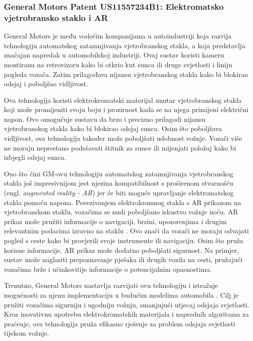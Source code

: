 \documentclass{foi}
\begin{document}
\subsubsection{General Motors Patent US11557234B1: Elektromatsko vjetrobransko staklo i AR}

General Motors je među vodećim kompanijama u autoindustriji \cite{GeneralMotors} koja razvija tehnologiju automatskog zatamnjivanja vjetrobranskog stakla, a koja predstavlja značajan napredak u automobilskoj industriji. Ovaj sustav koristi kameru montiranu na retrovizoru kako bi otkrio kut sunca ili druge svjetlosti i liniju pogleda vozača. Zatim prilagođava nijansu vjetrobranskog stakla kako bi blokirao odsjaj i poboljšao vidljivost. \cite{GeneralMotors2022}

Ova tehnologija koristi elektrokromatski materijal unutar vjetrobranskog stakla koji može promijeniti svoju boju i prozirnost kada se na njega primijeni električni napon. Ovo omogućuje sustavu da brzo i precizno prilagodi nijansu vjetrobranskog stakla kako bi blokirao odsjaj sunca. Osim što poboljšava vidljivost, ova tehnologija također može poboljšati udobnost vožnje. Vozači više ne moraju neprestano podešavati štitnik za sunce ili mijenjati položaj kako bi izbjegli odsjaj sunca. \cite{Bogdan2023}

Ono što čini GM-ovu tehnologiju automatskog zatamnjivanja vjetrobranskog stakla još impresivnijom jest njezina kompatibilnost s proširenom stvarnošću (engl. \emph{augmented reality - AR}) jer će biti moguće upravljanje elektromatskog stakla pomoću napona. Povezivanjem elektrokromnog stakla s AR prikazom na vjetrobranskom staklu, vozačima se nudi poboljšano iskustvo vožnje noću. AR prikaz može pružiti informacije o navigaciji, brzini, upozorenjima i drugim relevantnim podacima izravno na staklu \cite{TudoseSergiu2022}. Ovo znači da vozači ne moraju odvajati pogled s ceste kako bi provjerili svoje instrumente ili navigaciju. Osim što pruža korisne informacije, AR prikaz može dodatno poboljšati sigurnost. Na primjer, sustav može naglasiti prepoznavanje pješaka ili drugih vozila na cesti, pružajući vozačima brže i učinkovitije informacije o potencijalnim opasnostima. \cite{Bogdan2023} \cite{GeneralMotors2022}

Trenutno, General Motors nastavlja razvijati ovu tehnologiju i istražuje mogućnosti za njenu implementaciju u budućim modelima automobila \cite{Bogdan2023}. Cilj je pružiti vozačima sigurniju i ugodniju vožnju, smanjujući utjecaj odsjaja svjetlosti. Kroz inovativnu upotrebu elektrokromatskih materijala i naprednih algoritama za praćenje, ova tehnologija pruža efikasno rješenje za problem odsjaja svjetlosti tijekom vožnje.
\end{document}
